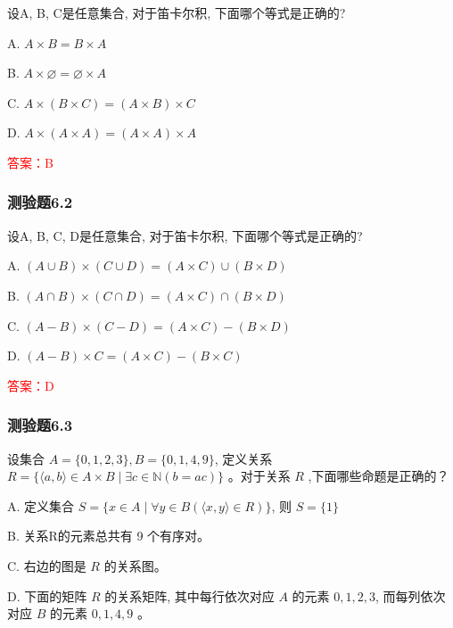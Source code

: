 \documentclass[UTF8, heading=true]{ctexart}
\begin{document}
设A, B, C是任意集合, 对于笛卡尔积, 下面哪个等式是正确的?

A. 
$
A \times B=B \times A
$

B. 
$
A \times \varnothing=\varnothing \times A
$

C. 
$
A \times(B \times C)=(A \times B) \times C
$

D. 
$
A \times(A \times A)=(A \times A) \times A
$

\textcolor{red}{答案：B}


\subsubsection{测验题6.2}
设A, B, C, D是任意集合, 对于笛卡尔积, 下面哪个等式是正确的?

A. 
$
(A \cup B) \times(C \cup D)=(A \times C) \cup(B \times D)
$

B. 
$
(A \cap B) \times(C \cap D)=(A \times C) \cap(B \times D)
$

C. 
$
(A-B) \times(C-D)=(A \times C)-(B \times D)
$

D. 
$
(A-B) \times C=(A \times C)-(B \times C)
$

\textcolor{red}{答案：D}

\subsubsection{测验题6.3}

设集合 $A=\{0,1,2,3\}, B=\{0,1,4,9\}$, 定义关系 $R=\{\langle a, b\rangle \in A \times B \mid \exists c \in \mathbb{N}(b=a c)\}$ 。对于关系 $R$ ,下面哪些命题是正确的？

A. 定义集合 $S=\{x \in A \mid \forall y \in B(\langle x, y\rangle \in R)\}$, 则 $S=\{1\}$

B. 关系R的元素总共有 9 个有序对。

C. 右边的图是 $R$ 的关系图。

D. 下面的矩阵 $R$ 的关系矩阵, 其中每行依次对应 $A$ 的元素 $0,1,2,3$, 而每列依次对应 $B$ 的元素 $0,1,4,9$ 。
\end{document}
